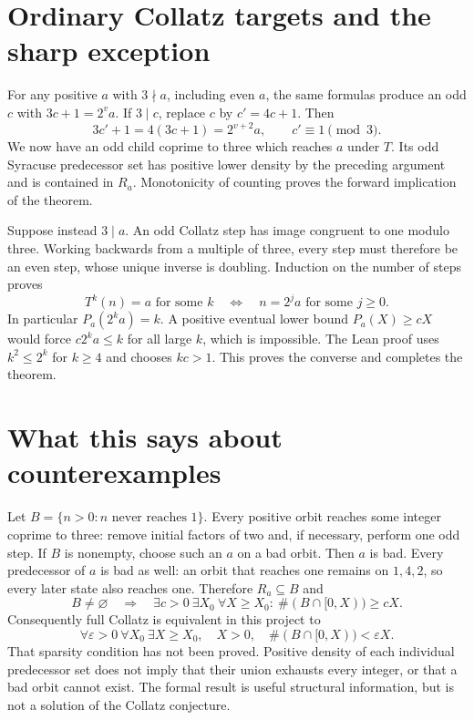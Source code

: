 \documentclass[11pt]{article}
\begin{document}
\section{Ordinary Collatz targets and the sharp exception}
For any positive $a$ with $3\nmid a$, including even $a$, the same formulas
produce an odd $c$ with $3c+1=2^v a$. If $3\mid c$, replace $c$ by
$c'=4c+1$. Then
\[
 3c'+1=4(3c+1)=2^{v+2}a,\qquad c'\equiv1\pmod3.
\]
We now have an odd child coprime to three which reaches $a$ under $T$.
Its odd Syracuse predecessor set has positive lower density by the preceding
argument and is contained in $R_a$. Monotonicity of counting proves the
forward implication of the theorem.

Suppose instead $3\mid a$. An odd Collatz step has image congruent to one
modulo three. Working backwards from a multiple of three, every step must
therefore be an even step, whose unique inverse is doubling. Induction
on the number of steps proves
\[
 T^k(n)=a\text{ for some }k\quad\Longleftrightarrow\quad
 n=2^j a\text{ for some }j\ge0.
\]
In particular $P_a(2^k a)=k$. A positive eventual lower bound $P_a(X)\ge cX$
would force $c2^k a\le k$ for all large $k$, which is impossible.
The Lean proof uses $k^2\le2^k$ for $k\ge4$ and chooses $kc>1$.
This proves the converse and completes the theorem.

\section{What this says about counterexamples}
Let $B=\{n>0:n\text{ never reaches }1\}$. Every positive orbit reaches
some integer coprime to three: remove initial factors of two and, if
necessary, perform one odd step. If $B$ is nonempty, choose such an $a$
on a bad orbit. Then $a$ is bad. Every predecessor of $a$ is bad as well:
an orbit that reaches one remains on $1,4,2$, so every later state also
reaches one. Therefore $R_a\subseteq B$ and
\[
 B\ne\varnothing\quad\Longrightarrow\quad
 \exists c>0\ \exists X_0\ \forall X\ge X_0:\ \#(B\cap[0,X))\ge cX.
\]
Consequently full Collatz is equivalent in this project to
\[
 \forall\varepsilon>0\ \forall X_0\ \exists X\ge X_0,
 \quad X>0,\quad \#(B\cap[0,X))<\varepsilon X.
\]
That sparsity condition has not been proved. Positive density of each
individual predecessor set does not imply that their union exhausts every
integer, or that a bad orbit cannot exist. The formal result is useful
structural information, but is not a solution of the Collatz conjecture.
\end{document}
